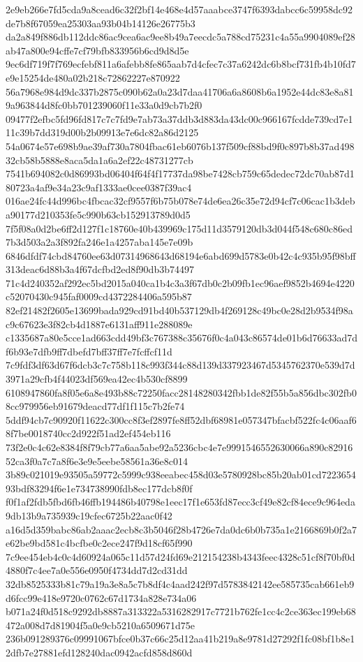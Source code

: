 \documentclass[11pt,a4paper]{article}
\begin{document}
{2e9eb266e7fd5cda9a8cead6c32f2bf14e468e4d57aaabce3747f6393dabcc6c59958dc92de7b8f67059ea25303aa93b04b14126e26775b3
da2a849f886db112ddc86ac9cea6ac9ee8b49a7eecdc5a788cd75231c4a55a9904089ef28ab47a800e94cffe7cf79bfb833956b6cd9d8d5e
9ec6df719f7f769ecfebf811a6afebb8fe865aab7d4cfec7c37a6242dc6b8bcf731fb4b10fd7e9e15254de480a02b218c72862227e870922
56a7968e984d9dc337b2875c090b62a0a23d7daa41706a6a8608b6a1952e44dc83e8a819a963844d8fc0bb701239060f11e33a0d9cb7b2f0
09477f2efbc5fd96fd817c7c7fd9e7ab73a37ddb3d883da43dc00c966167fcdde739cd7e111c39b7dd319d00b2b09913e7e6dc82a86d2125
54a0674e57e698b9ae39af730a7804fbac61eb6076b137f509cf88bd9f0c897b8b37ad49832cb58b5888e8aca5da1a6a2ef22c48731277cb
7541b694082c0d86993bd06404f64f4f17737da98be7428cb759c65dedec72dc70ab87d180723a4af9e34a23c9af1333ae0cee0387f39ac4
016ae24fc44d996bc4fbcac32cf9557f6b75b078e74de6ea26c35e72d94cf7c06cac1b3deba90177d210353fe5c990b63cb152913789d0d5
7f5f08a0d2be6ff2d127f1c18760e40b439969c175d11d3579120db3d044f548c680c86ed7b3d503a2a3f892fa246e1a4257aba145e7e09b
6846dfdf74cbd84760ee63d07314968643d68194e6abd699d5783e0b42c4c935b95f98bff313deac6d88b3a4f67dcfbd2ed8f90db3b74497
71c4d240352af292ec5bd2015a040ca1b4c3a3f67db0c2b09fb1ec96aef9852b4694e4220c52070430c945faf0009cd4372284406a595b87
82ef21482f2605e13699bada929cd91bd40b537129db4f269128c49bc0e28d2b9534f98ac9c67623e3f82cb4d1887e6131aff911e288089e
c1335687a80e5cce1ad663cdd49bf3c767388c35676f0c4a043c86574de01b6d76633ad7df6b93e7dfb9ff7dbefd7bff37ff7e7fcffcf11d
7c9fdf3df63d67f6dcb3c7c758b118c993f344c88d139d337923467d5345762370e539d7d3971a29cfb4f44023df569ea42ec4b530cf8899
6108947860fa8f05e6a8e493b88c72250facc28148280342fbb1de82f55b5a856dbc302fb08cc979956eb91679deacd77df1f115c7b2fe74
5ddf94cb7c90920f11622c300cc8f3ef2897fe8ff52dbf68981e057347bfacbf522fc4c06aaf68f7be0018740cc2d922f51ad2ef454eb116
73f2e0c4c62e8384f8f79cb77a6aa5abe92a5236cbc4e7e9991546552630066a890c8291652ca3f0a7c7a8f6e3e9e5eebe58561a36e8c014
3b89c021019e93505a59772c5999c938eeabec458d03e5780928bc85b20ab01cd722365493bdf83294f6e1e734738990fdb8ec177dcb8f0f
f0f1af2fdb5fbd6fb46ffb194486b40798e1eec17f1e653fd87ecc3cf49e82cf84ece9c964eda9db13b9a735939c19cfec6725b22aac0f42
a16d5d359babc86ab2aaac2ecb8c3b5046f28b4726e7da0dc6b0b735a1e2166869b0f2a7e62be9bd581c4bcfbe0c2ece247f9d18cf65f990
7c9ee454eb4c0c4d60924a065c11d57d24fd69e212154238b4343feec4328c51cf8f70bf0d4880f7c4ee7a0e556e0950f4734dd7d2cd31dd
32db8525333b81c79a19a3e8a5c7b8df4c4aad242f97d5783842142ee585735cab661eb9d6fcc99e418e9720c0762c67d1734a828e734a06
b071a24f0d518c9292db8887a313322a5316282917c7721b762fe1cc4c2ce363ec199eb68472a008d7d81904f5a0e9cb5210a6509671d75e
236b091289376c09991067bfce0b37c66c25d12aa41b219a8e9781d27292f1fc08bf1b8e12dfb7e27881efd128240dac0942acfd858d860d
}
\end{document}
